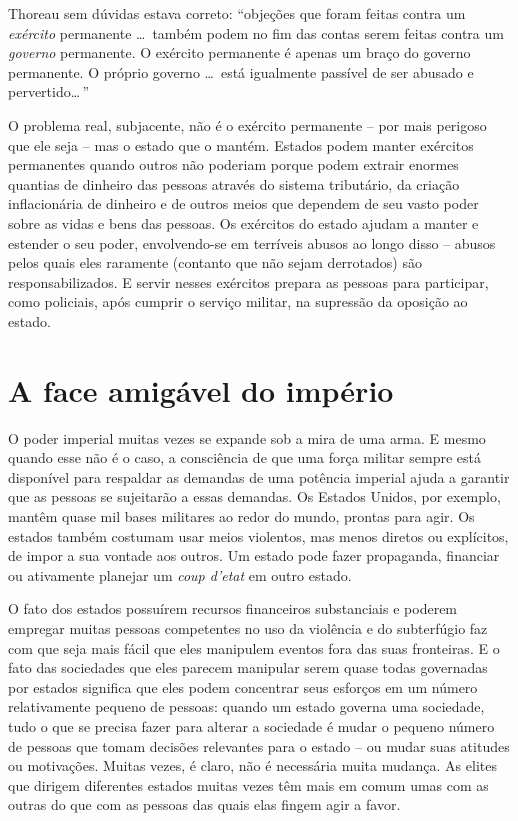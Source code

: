 Thoreau sem dúvidas estava correto: ``objeções que foram feitas contra um \emph{exército} permanente \ldots\ também podem no fim das contas serem feitas contra um \emph{governo} permanente. O exército permanente é apenas um braço do governo permanente. O próprio governo \ldots\ está igualmente passível de ser abusado e pervertido\ldots\,''

O problema real, subjacente, não é o exército permanente -- por mais perigoso que ele seja -- mas o estado que o mantém. Estados podem manter exércitos permanentes quando outros não poderiam porque podem extrair enormes quantias de dinheiro das pessoas através do sistema tributário, da criação inflacionária de dinheiro e de outros meios que dependem de seu vasto poder sobre as vidas e bens das pessoas. Os exércitos do estado ajudam a manter e estender o seu poder, envolvendo-se em terríveis abusos ao longo disso -- abusos pelos quais eles raramente (contanto que não sejam derrotados) são responsabilizados. E servir nesses exércitos prepara as pessoas para participar, como policiais, após cumprir o serviço militar, na supressão da oposição ao estado.

\section{A face amigável do império}

O poder imperial muitas vezes se expande sob a mira de uma arma. E mesmo quando esse não é o caso, a consciência de que uma força militar sempre está disponível para respaldar as demandas de uma potência imperial ajuda a garantir que as pessoas se sujeitarão a essas demandas. Os Estados Unidos, por exemplo, mantêm quase mil bases militares ao redor do mundo, prontas para agir. Os estados também costumam usar meios violentos, mas menos diretos ou explícitos, de impor a sua vontade aos outros. Um estado pode fazer propaganda, financiar ou ativamente planejar um \emph{coup d'etat} em outro estado.

O fato dos estados possuírem recursos financeiros substanciais e poderem empregar muitas pessoas competentes no uso da violência e do subterfúgio faz com que seja mais fácil que eles manipulem eventos fora das suas fronteiras. E o fato das sociedades que eles parecem manipular serem quase todas governadas por estados significa que eles podem concentrar seus esforços em um número relativamente pequeno de pessoas: quando um estado governa uma sociedade, tudo o que se precisa fazer para alterar a sociedade é mudar o pequeno número de pessoas que tomam decisões relevantes para o estado -- ou mudar suas atitudes ou motivações. Muitas vezes, é claro, não é necessária muita mudança. As elites que dirigem diferentes estados muitas vezes têm mais em comum umas com as outras do que com as pessoas das quais elas fingem agir a favor.

